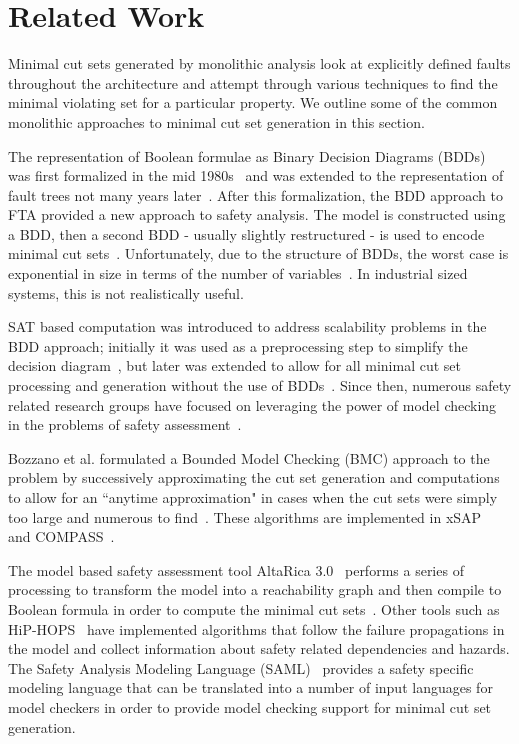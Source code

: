 \section{Related Work}
\label{sec:related_work}
Minimal cut sets generated by monolithic analysis look at explicitly defined faults throughout the architecture and attempt through various techniques to find the minimal violating set for a particular property. We outline some of the common monolithic approaches to minimal cut set generation in this section.

The representation of Boolean formulae as Binary Decision Diagrams (BDDs) was first formalized in the mid 1980s~\cite{bryant1986graph} and was extended to the representation of fault trees not many years later~\cite{rauzy1993new}. After this formalization, the BDD approach to FTA provided a new approach to safety analysis. The model is constructed using a BDD, then a second BDD - usually slightly restructured - is used to encode minimal cut sets~\cite{rauzy2008binary}. Unfortunately, due to the structure of BDDs, the worst case is exponential in size in terms of the number of variables~\cite{bryant1986graph,rauzy1993new,rauzy2008binary}. In industrial sized systems, this is not realistically useful. 

SAT based computation was introduced to address scalability problems in the BDD approach; initially it was used as a preprocessing step to simplify the decision diagram~\cite{bozzano2015safety}, but later was extended to allow for all minimal cut set processing and generation without the use of BDDs~\cite{bozzano2015efficient}. Since then, numerous safety related research groups have focused on leveraging the power of model checking in the problems of safety assessment~\cite{bieber2002combination,schafer2003combining,bozzano2007symbolic,bozzano2003improving,volk2017fast,Joshi05:SafeComp,bozzano2015efficient,stewart2020safety}. 

Bozzano et al. formulated a Bounded Model Checking (BMC) approach to the problem by successively approximating the cut set generation and computations to allow for an ``anytime approximation" in cases when the cut sets were simply too large and numerous to find~\cite{bozzano2015efficient,mattarei2016scalable}. These algorithms are implemented in xSAP~\cite{DBLP:conf/tacas/BittnerBCCGGMMZ16} and COMPASS~\cite{compass30toolset}. 

The model based safety assessment tool AltaRica 3.0~\cite{prosvirnova:tel-01119730} performs a series of processing to transform the model into a reachability graph and then compile to Boolean formula in order to compute the minimal cut sets~\cite{prosvirnova2015automated}. Other tools such as HiP-HOPS~\cite{papadopoulos2001model} have implemented algorithms that follow the failure propagations in the model and collect information about safety related dependencies and hazards. The Safety Analysis Modeling Language (SAML)~\cite{Gudemann:2010:FQQ:1909626.1909813} provides a safety specific modeling language that can be translated into a number of input languages for model checkers in order to provide model checking support for minimal cut set generation.

